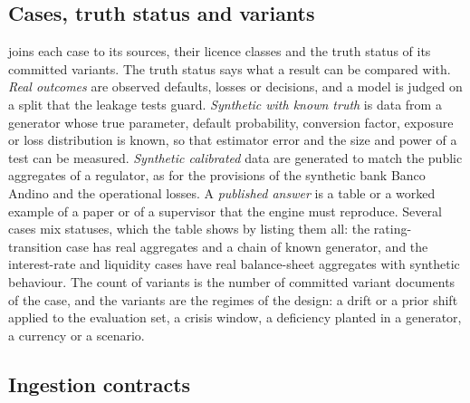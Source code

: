 

\subsection{Cases, truth status and variants}
\label{sec:data-cases}

 joins each case to its sources, their licence classes and the truth status of its committed variants. The truth status says what a result can be compared with.
\emph{Real outcomes} are observed defaults, losses or decisions, and a model is judged on a split that the leakage tests guard. \emph{Synthetic with known truth} is data from a generator whose
true parameter, default probability, conversion factor, exposure or loss distribution is known, so that estimator error and the size and power of a test can be measured. \emph{Synthetic calibrated}
data are generated to match the public aggregates of a regulator, as for the provisions of the synthetic bank Banco Andino and the operational losses. A \emph{published answer} is a table or a worked example of a paper
or of a supervisor that the engine must reproduce. Several cases mix statuses, which the table shows by listing them all: the rating-transition case has real aggregates and a chain of known generator, and the interest-rate and
liquidity cases have real balance-sheet aggregates with synthetic behaviour. The count of variants is the number of committed variant documents of the case, and the variants are the regimes of the design: a drift or a prior shift applied to the
evaluation set, a crisis window, a deficiency planted in a generator, a currency or a scenario.



\subsection{Ingestion contracts}
\label{sec:data-ingestion}

